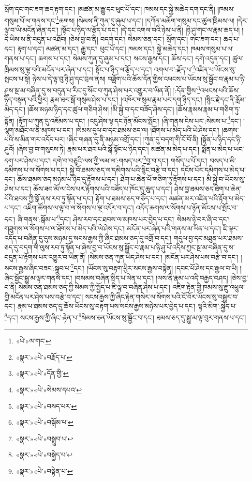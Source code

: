 སྲོག་དང་གང་ཟག་ཆད་རྟག་དང་། །མཚན་མ་རྒྱུ་དང་ཕུང་པོ་དང་། ཁམས་དང་སྐྱེ་མཆེད་དག་དང་ནི། །ཁམས་གསུམ་པོ་ལ་གནས་དང་\footnote{«པེ་»ལ་གང་}ཆགས། །སེམས་ནི་ཀུན་དུ་ཞུམ་པ་དང་། །དཀོན་མཆོག་གསུམ་དང་ཚུལ་ཁྲིམས་ལ། །དེར་ལྟ་བ་ཡི་མངོན་ཞེན་དང་། །སྟོང་པ་ཉིད་ལ་རྩོད་པ་དང་། །དེ་དང་འགལ་བའི་ཉེས་པ་ནི། །ཉི་ཤུ་གང་ལ་རྣམ་ཆད་པ། །དེ་ཡིས་ས་ནི་བདུན་པ་འཐོབ། །ཅེས་བྱ་བ་ནི། བདག་དང་། སེམས་ཅན་དང་། སྲོག་དང་། གང་ཟག་དང་། ཆད་པ་དང་། རྟག་པ་དང་། མཚན་མ་དང་། རྒྱུ་དང་། ཕུང་པོ་དང་། ཁམས་དང་། སྐྱེ་མཆེད་དང་། ཁམས་གསུམ་པ་ལ་གནས་པ་དང་། ཆགས་པ་དང་། སེམས་ཀུན་དུ་ཞུམ་པ་དང་། སངས་རྒྱས་དང་། ཆོས་དང་། དགེ་འདུན་དང་། ཚུལ་ཁྲིམས་སུ་ལྟ་བའི་མངོན་པར་ཞེན་པ་དང་། སྟོང་པ་ཉིད་ལ་རྩོད་པ་དང་། འགལ་བ་:རྗོད་པ་\footnote{«སྣར་»«པེ་»བརྗོད་པ་}འཛིན་པ་ཡོངས་སུ་སྤངས་པ་སྟེ། ཉེས་པ་དེ་ལྟ་བུ་ཉི་ཤུ་དང་བྲལ་ནས། བཟློག་པའི་ཆོས་དོན་གྱིས་འཕངས་པ་ཡོངས་སུ་སྦྱོང་བ་རྣམ་པ་ཉི་ཤུས་སྔ་མ་བཞིན་དུ་ས་བདུན་པ་རིང་དུ་སོང་བ་ཀུན་ཤེས་པར་འགྱུར་བ་ཡིན་ནོ། །:དོན་གྱིས་\footnote{«སྣར་»«པེ་»དོན་གྱི་}འཕངས་པའི་ཆོས་ཉིད་བསྟན་པའི་ཕྱིར། རྣམ་ཐར་སྒོ་གསུམ་ཤེས་པ་དང་། །འཁོར་གསུམ་རྣམ་པར་དག་ཉིད་དང་། །སྙིང་རྗེ་དང་ནི་རློམ་མེད་དང་། །ཆོས་མཉམ་ཉིད་དང་ཚུལ་གཅིག་ཤེས། །མི་སྐྱེ་བ་དང་བཟོད་ཤེས་དང་། །ཆོས་རྣམས་རྣམ་པ་གཅིག་ཏུ་སྟོན། །རྟོག་པ་ཀུན་དུ་འཇོམས་པ་དང་། །འདུ་ཤེས་ལྟ་དང་ཉོན་མོངས་སྤོང་། །ཞི་གནས་ངེས་པར་:སེམས་པ་\footnote{«སྣར་»«པེ་»སེམས་དཔའ་}དང་། །ལྷག་མཐོང་ལ་ནི་མཁས་པ་དང་། །སེམས་དུལ་བ་དང་ཐམས་ཅད་ལ། །ཐོགས་པ་མེད་པའི་ཡེ་ཤེས་དང་། །ཆགས་པའི་ས་མིན་གར་འདོད་པར། །ཞིང་གཞན་དུ་ནི་མཉམ་འགྲོ་དང་། །ཀུན་དུ་བདག་གི་ངོ་བོ་ནི། །སྟོན་པ་ཉིད་དང་ཉི་ཤུའོ། །ཞེས་བྱ་བ་གསུངས་ཏེ། རྣམ་པར་ཐར་པའི་སྒོ་སྟོང་པ་ཉིད་དང་། མཚན་མ་མེད་པ་དང་། སྨོན་པ་མེད་པ་ཡང་དག་པར་ཤེས་པ་དང་། དགེ་བ་བཅུའི་ལས་ཀྱི་ལམ་ལ་:གསད་པར་\footnote{«སྣར་»«པེ་»བསད་པར་}བྱ་བ་དང་། གསོད་པ་པོ་དང་། བསད་པ་མི་དམིགས་པ་ལ་སོགས་པ་དང་། སྐྱེ་བོ་ཐམས་ཅད་ལ་དམིགས་པའི་སྙིང་བརྩེ་བ་དང་། དངོས་པོར་དམིགས་པ་མེད་པ་དང་། ཆོས་ཐམས་ཅད་མཉམ་པ་ཉིད་དུ་རྟོགས་པ་དང་། ཐེག་པ་ཆེན་པོ་གཅིག་ཏུ་རྟོགས་པ་དང་། མི་སྐྱེ་བ་ཡོངས་སུ་ཤེས་པ་དང་། ཆོས་ཟབ་མོ་ལ་ངེས་པར་རྟོགས་པའི་བཟོད་པ་ཁོང་དུ་ཆུད་པ་དང་། ཤེས་བྱ་ཐམས་ཅད་ཐེག་པ་ཆེན་པོའི་ཐབས་ཀྱི་སྒོ་ནས་རབ་ཏུ་སྟོན་པ་དང་། རྟོག་པ་ཐམས་ཅད་གཅོད་པ་དང་། མཚན་མར་འཛིན་པའི་རྟོག་པ་མེད་པ་དང་། འཇིག་ཚོགས་ལ་ལྟ་བ་ལ་སོགས་པ་ལྔ་འདོར་བ་དང་། འདོད་ཆགས་ལ་སོགས་པ་ཉོན་མོངས་པ་སྤོང་བ་དང་། ཞི་གནས་:སྒོམ་པ་\footnote{«སྣར་»«པེ་»བསྒོམ་པ་}དང་། ཤེས་རབ་དང་ཐབས་ལ་མཁས་པར་བྱེད་པ་དང་། སེམས་ཉེ་བར་ཞི་བ་དང་། གཟུགས་ལ་སོགས་པ་ལ་ཐོགས་པ་མེད་པའི་ཡེ་ཤེས་དང་། མངོན་པར་ཞེན་པའི་གནས་མ་ཡིན་པ་དང་། ཇི་ལྟར་འདོད་པ་བཞིན་དུ་དུས་མཉམ་དུ་སངས་རྒྱས་ཀྱི་ཞིང་ཐམས་ཅད་དུ་འགྲོ་བ་དང་། གདུལ་བྱ་དང་མཐུན་པར་ཐམས་ཅད་དུ་བདག་གི་ལུས་རབ་ཏུ་སྟོན་པ་ཞེས་བྱ་བ་ཡོངས་སུ་སྦྱོང་བ་རྣམ་པ་ཉི་ཤུ་པོ་འདིས་ཀྱང་སྔ་མ་བཞིན་དུ་ས་བདུན་པ་རྟོགས་པར་འགྱུར་བ་ཡིན་ནོ། །སེམས་ཅན་ཀུན་ཡིད་ཤེས་པ་དང་། །མངོན་པར་ཤེས་པས་བརྩེ་བ་དང་། །སངས་རྒྱས་ཞིང་བཟང་:སྒྲུབ་པ་\footnote{«སྣར་»«པེ་»བསྒྲུབ་པ་}དང་། །ཡོངས་སུ་བརྟག་ཕྱིར་སངས་རྒྱས་བསྟེན། །དབང་པོ་ཤེས་དང་རྒྱལ་བ་ཡི། །ཞིང་སྦྱོང་སྒྱུ་མ་ལྟར་གནས་དང་། །བསམས་བཞིན་སྲིད་པ་ལེན་པ་དང་། །ལས་ནི་རྣམ་པ་འདི་བརྒྱད་བཤད། །ཅེས་བྱ་བ་ནི། སེམས་ཅན་ཐམས་ཅད་ཀྱི་སེམས་ཀྱི་སྤྱོད་པ་ཇི་ལྟ་བ་བཞིན་ཤེས་པ་དང་། འཇིག་རྟེན་གྱི་ཁམས་སུ་རྫུ་འཕྲུལ་གྱི་མངོན་པར་ཤེས་པས་བརྩེ་བ་དང་། སངས་རྒྱས་ཀྱི་ཞིང་རྟེན་གསེར་ལ་སོགས་པའི་ངོ་བོར་ཡོངས་སུ་བསྒྱུར་བ་དང་། རྣམ་པ་ཐམས་ཅད་དུ་ཆོས་ཡོངས་སུ་བརྟག་པས་སངས་རྒྱས་མཉེས་པར་བྱེད་པ་དང་། ལྷའི་མིག་:སྐྱེད་པ་\footnote{«སྣར་»«པེ་»བསྐྱེད་པ་}དང་། སངས་རྒྱས་ཀྱི་ཞིང་:རྟེན་པ་\footnote{«སྣར་»«པེ་»བསྟེན་པ་}སེམས་ཅན་ཡོངས་སུ་སྦྱོང་བ་དང་། ཐམས་ཅད་དུ་སྒྱུ་མ་ལྟ་བུར་གནས་པ་དང་། 
